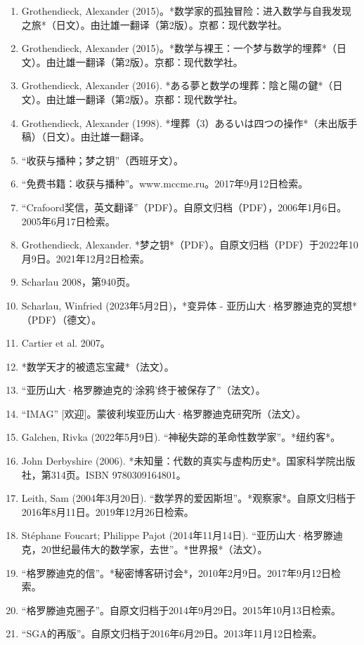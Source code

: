 \begin{enumerate}
\item Grothendieck, Alexander (2015)。*数学家的孤独冒险：进入数学与自我发现之旅*（日文）。由辻雄一翻译（第2版）。京都：现代数学社。  
\item Grothendieck, Alexander (2015)。*数学与裸王：一个梦与数学的埋葬*（日文）。由辻雄一翻译（第2版）。京都：现代数学社。
\item Grothendieck, Alexander (2016). *ある夢と数学の埋葬：陰と陽の鍵*（日文）。由辻雄一翻译（第2版）。京都：现代数学社。  
\item Grothendieck, Alexander (1998). *埋葬（3）あるいは四つの操作*（未出版手稿）（日文）。由辻雄一翻译。  
\item “收获与播种；梦之钥”（西班牙文）。  
\item “免费书籍：收获与播种”。www.mccme.ru。2017年9月12日检索。  
\item “Crafoord奖信，英文翻译”（PDF）。自原文归档（PDF），2006年1月6日。2005年6月17日检索。  
\item Grothendieck, Alexander. *梦之钥*（PDF）。自原文归档（PDF）于2022年10月9日。2021年12月2日检索。  
\item Scharlau 2008，第940页。  
\item Scharlau, Winfried (2023年5月2日)，*变异体 - 亚历山大·格罗滕迪克的冥想*（PDF）（德文）。  
\item Cartier et al. 2007。  
\item *数学天才的被遗忘宝藏*（法文）。
\item “亚历山大·格罗滕迪克的‘涂鸦’终于被保存了”（法文）。  
\item “IMAG” [欢迎]。蒙彼利埃亚历山大·格罗滕迪克研究所（法文）。  
\item Galchen, Rivka (2022年5月9日). “神秘失踪的革命性数学家”。*纽约客*。  
\item John Derbyshire (2006). *未知量：代数的真实与虚构历史*。国家科学院出版社，第314页。ISBN 9780309164801。  
\item Leith, Sam (2004年3月20日). “数学界的爱因斯坦”。*观察家*。自原文归档于2016年8月11日。2019年12月26日检索。  
\item Stéphane Foucart; Philippe Pajot (2014年11月14日). “亚历山大·格罗滕迪克，20世纪最伟大的数学家，去世”。*世界报*（法文）。  
\item “格罗滕迪克的信”。*秘密博客研讨会*，2010年2月9日。2017年9月12日检索。  
\item “格罗滕迪克圈子”。自原文归档于2014年9月29日。2015年10月13日检索。  
\item “SGA的再版”。自原文归档于2016年6月29日。2013年11月12日检索。  

\end{enumerate}
